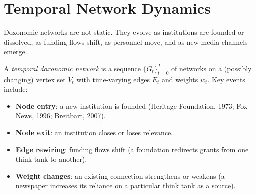 \section{Temporal Network Dynamics}
\label{sec:ch15-temporal}

Doxonomic networks are not static.
They evolve as institutions are founded or dissolved, as funding flows shift, as personnel move, and as new media channels emerge.

\begin{definition}
\label{def:network-evolution}
A \emph{temporal doxonomic network} is a sequence $\{G_t\}_{t=0}^{T}$ of networks on a (possibly changing) vertex set $V_t$ with time-varying edges $E_t$ and weights $w_t$.
Key events include:
\begin{itemize}[nosep]
  \item \textbf{Node entry}: a new institution is founded (Heritage Foundation, 1973; Fox News, 1996; Breitbart, 2007).
  \item \textbf{Node exit}: an institution closes or loses relevance.
  \item \textbf{Edge rewiring}: funding flows shift (a foundation redirects grants from one think tank to another).
  \item \textbf{Weight changes}: an existing connection strengthens or weakens (a newspaper increases its reliance on a particular think tank as a source).
\end{itemize}
\end{definition}

